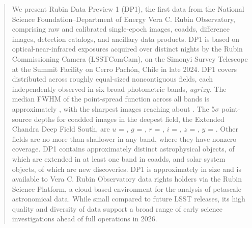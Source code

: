 \begin{abstract}
We present Rubin Data Preview 1 (DP1), the first data from the National Science Foundation--Department of Energy Vera C. Rubin Observatory, comprising raw and calibrated single-epoch images, coadds, difference images, detection catalogs, and ancillary data products.
DP1 is based on \nexposures optical-near-infrared exposures acquired over \nnightscomcam distinct nights by the Rubin Commissioning Camera (LSSTComCam), on the Simonyi Survey Telescope at the Summit Facility on Cerro Pach\'on, Chile in late 2024.
DP1 covers \totalarea distributed across \nfields roughly equal-sized noncontiguous fields, each independently observed in six broad photometric bands, $ugrizy$.
The median FWHM of the point-spread function across all bands is approximately \medianimagequalityallbands, with the sharpest images reaching about \bestimagequality.
The 5$\sigma$  point-source  depths for coadded  images in the deepest field, the Extended Chandra Deep Field South, are $u$ = \udepth,  $g$ = \gdepth, $r$ = \rdepth, $i$ = \idepth, $z$ = \zdepth, $y$ = \ydepth.
Other fields are no more than \maxdepthshalloweranyband shallower in any band, where they have nonzero coverage.
DP1 contains approximately \nobjects distinct astrophysical objects, of which \nextendedobjects are extended in at least one band in coadds, and \nsolarsystemobjects solar system objects, of which \nnewasteroiddiscoveries are new discoveries.
DP1 is approximately \sizeinbytes in size and is available to Vera C. Rubin Observatory data rights holders via the Rubin Science Platform, a cloud-based environment for the analysis of petascale astronomical data.
While small compared to future LSST releases, its high quality and diversity of data support a broad range of early science investigations ahead of full operations in 2026.
\end{abstract}